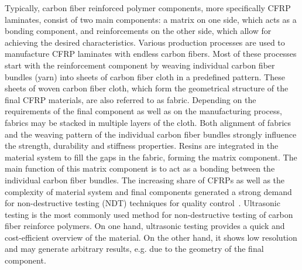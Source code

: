 Typically, carbon fiber reinforced polymer components, more specifically CFRP laminates, consist of two main components:
a matrix on one side, which acts as a bonding component, and  reinforcements on the other side, which allow for achieving the desired characteristics.  Various production processes are used to manufacture CFRP laminates with endless carbon fibers. Most of these processes start with the reinforcement component by weaving individual carbon fiber bundles (yarn) into sheets of carbon fiber cloth in a predefined pattern. These sheets of woven carbon fiber cloth, which form the geometrical structure of the final CFRP materials, are also referred to as fabric. Depending on the requirements of the final component as well as on the manufacturing process, fabrics may be stacked in multiple layers of the cloth. Both alignment of fabrics and the weaving pattern of the individual carbon fiber bundles strongly influence the strength, durability and stiffness properties. Resins are integrated in the material system to fill the gaps in the fabric, forming the matrix component. The main function of this matrix component is to act as a bonding between the individual carbon fiber bundles. 
The increasing share of CFRPs as well as the complexity of material system and final components generated a strong demand for non-destructive testing (NDT) techniques for quality control~\cite{Red2012}. Ultrasonic testing is the most commonly used method for non-destructive testing of carbon fiber reinforce polymers. On one hand, ultrasonic testing provides a quick and cost-efficient overview of the material. On the other hand, it shows low resolution and may generate arbitrary results, e.g. due to the geometry of the final component. 


